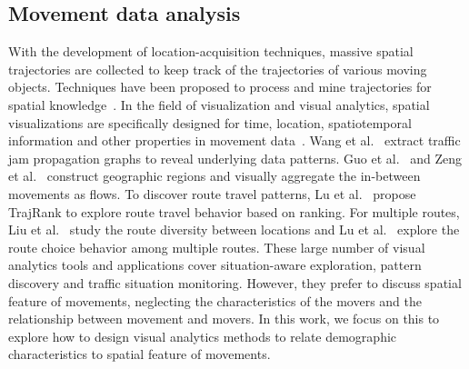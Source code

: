 \documentclass{ieeeaccess}
\begin{document}
\subsection{Movement data analysis}
With the development of location-acquisition techniques, massive spatial trajectories are collected to keep track of the trajectories of various moving objects. Techniques have been proposed to process and mine trajectories for spatial knowledge~\cite{Zheng2015_trajectory}. In the field of visualization and visual analytics, spatial visualizations are specifically designed for time, location, spatiotemporal information and other properties in movement data~\cite{chen2015survey}. Wang et al.~\cite{wang2013visual} extract traffic jam propagation graphs to reveal underlying data patterns. Guo et al.~\cite{guo2011tripvista} and Zeng et al.~\cite{zeng2013visualizing} construct geographic regions and visually aggregate the in-between movements as flows. To discover route travel patterns, Lu et al.~\cite{lu2015trajrank} propose TrajRank to explore route travel behavior based on ranking. For multiple routes, Liu et al.~\cite{liu2011_routediversity} study the route diversity between locations and Lu et al.~\cite{Lu2017_multipleroute} explore the route choice behavior among multiple routes. These large number of visual analytics tools and applications cover situation-aware exploration, pattern discovery and traffic situation monitoring. However, they prefer to discuss spatial feature of movements, neglecting the characteristics of the movers and the relationship between movement and movers. In this work, we focus on this to explore how to design visual analytics methods to relate demographic characteristics to spatial feature of movements.
\end{document}
